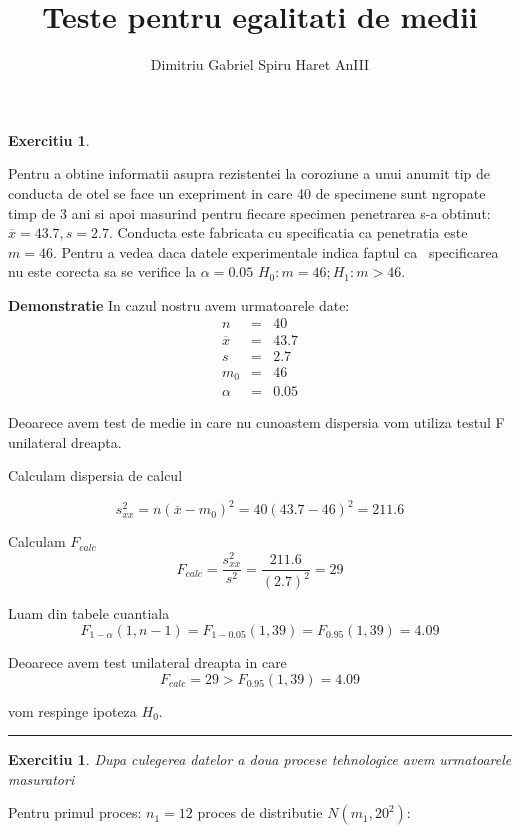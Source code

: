 \documentclass{article}
\newtheorem{exercise}[theorem]{Exercitiu}
\newenvironment{proof}[1][Proof]{\noindent\textbf{Demonstratie} }{\ \rule{0.5em}{0.5em}}
\begin{document}
\title{Teste pentru egalitati de medii}
\author{Dimitriu Gabriel Spiru Haret AnIII}
\maketitle

\begin{exercise}
\bigskip 
\end{exercise}

Pentru a obtine informatii asupra rezistentei la coroziune a unui anumit tip
de conducta de otel se face un exepriment in care 40 de specimene sunt
ngropate timp de 3 ani si apoi masurind pentru fiecare specimen penetrarea
s-a obtinut: $\overline{x}=43.7,s=2.7$. Conducta este fabricata cu
specificatia ca penetratia este $m=46$. Pentru a vedea daca datele
experimentale indica faptul ca \ specificarea nu este corecta sa se verifice
la $\alpha =0.05$ $H_{0}:m=46;H_{1}:m>46$.

\begin{proof}
In cazul nostru avem urmatoarele date:%
\begin{eqnarray*}
n &=&40 \\
\overline{x} &=&43.7 \\
s &=&2.7 \\
m_{0} &=&46 \\
\alpha  &=&0.05
\end{eqnarray*}

Deoarece avem test de medie in care nu cunoastem dispersia vom utiliza
testul F unilateral dreapta.

Calculam dispersia de calcul

\[
s_{xx}^{2}=n(\overline{x}-m_{0})^{2}=40(43.7-46)^{2}=211.6
\]

Calculam $F_{calc}$%
\[
F_{calc}=\frac{s_{xx}^{2}}{s^{2}}=\frac{211.6}{(2.7)^{2}}=29
\]

Luam din tabele cuantiala%
\[
F_{1-\alpha }(1,n-1)=F_{1-0.05}(1,39)=F_{0.95}(1,39)=4.09
\]

Deoarece avem test unilateral dreapta in care%
\[
F_{calc}=29>F_{0.95}(1,39)=4.09
\]

vom respinge ipoteza $H_{0}$.
\end{proof}

\begin{exercise}
Dupa culegerea datelor a doua procese tehnologice avem urmatoarele masuratori
\end{exercise}

Pentru primul proces: $n_{1}=12$ proces de distributie $N(m_{1},20^{2})$:
\end{document}
